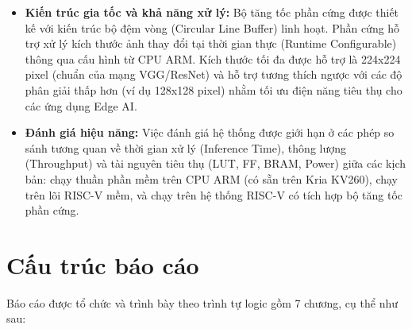 \begin{itemize}
    \item \textbf{Kiến trúc gia tốc và khả năng xử lý:} Bộ tăng tốc phần cứng được thiết kế với kiến trúc bộ đệm vòng (Circular Line Buffer) linh hoạt. Phần cứng hỗ trợ xử lý kích thước ảnh thay đổi tại thời gian thực (Runtime Configurable) thông qua cấu hình từ CPU ARM. Kích thước tối đa được hỗ trợ là 224x224 pixel (chuẩn của mạng VGG/ResNet) và hỗ trợ tương thích ngược với các độ phân giải thấp hơn (ví dụ 128x128 pixel) nhằm tối ưu điện năng tiêu thụ cho các ứng dụng Edge AI.

    \item \textbf{Đánh giá hiệu năng:} Việc đánh giá hệ thống được giới hạn ở các phép so sánh tương quan về thời gian xử lý (Inference Time), thông lượng (Throughput) và tài nguyên tiêu thụ (LUT, FF, BRAM, Power) giữa các kịch bản: chạy thuần phần mềm trên CPU ARM (có sẵn trên Kria KV260), chạy trên lõi RISC-V mềm, và chạy trên hệ thống RISC-V có tích hợp bộ tăng tốc phần cứng.
\end{itemize}

\newpage
\section{Cấu trúc báo cáo}

Báo cáo được tổ chức và trình bày theo trình tự logic gồm 7 chương, cụ thể như sau:

